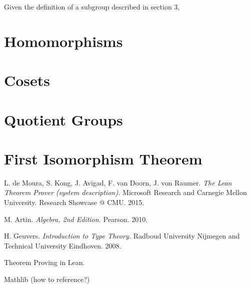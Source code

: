 \documentclass[runningheads,a4paper]{llncs}
\renewcommand{\-}{\setminus}
\begin{document}
Given the definition of a subgroup described in section 3, 


\section{Homomorphisms}




\section{Cosets}

\section{Quotient Groups}

\section{First Isomorphism Theorem}


\begin{thebibliography}{1}

 L. de Moura, S. Kong, J. Avigad, F. van Doorn, J. von Raumer. {\em The Lean Theorem Prover (system description).} Microsoft Research and Carnegie Mellon University. Research Showcase @ CMU. 2015.

 M. Artin. {\em Algebra, 2nd Edition.} Pearson. 2010.

 H. Geuvers. {\em Introduction to Type Theory.} Radboud University Nijmegen and Technical University Eindhoven. 2008.

 Theorem Proving in Lean.

 Mathlib (how to reference?)

\end{thebibliography}
\end{document}
